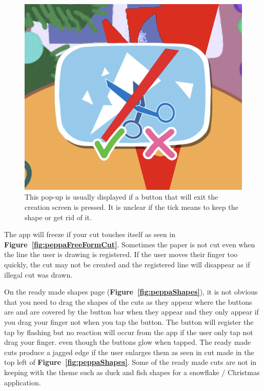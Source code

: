 \documentclass[11pt]{article}
\begin{document}
\begin{figure}[!ht]
                        \begin{minipage}{0.32\textwidth}
                            \centering
                            \includegraphics[width=0.8\linewidth]{Images/peppa/peppaPopUp.png}
                             \caption{This pop-up is usually displayed if a button that will exit the creation screen is pressed. It is unclear if the tick means to keep the shape or get rid of it.}
                            \label{fig:peppaPopUp}
                        \end{minipage}
                    \end{figure}
                    
                    The app will freeze if your cut touches itself as seen in \textbf{Figure~\ref{fig:peppaFreeFormCut}}. Sometimes the paper is not cut even when the line the user is drawing is registered. If the user moves their finger too quickly, the cut may not be created and the registered line will disappear as if illegal cut was drawn.
                    
                    On the ready made shapes page (\textbf{Figure~\ref{fig:peppaShapes}}), it is not obvious that you need to drag the shapes of the cuts as they appear where the buttons are and are covered by the button bar when they appear and they only appear if you drag your finger not when you tap the button. The button will register the tap by flashing but no reaction will occur from the app if the user only tap not drag your finger.  even though the buttons glow when tapped. The ready made cuts produce a jagged edge if the user enlarges them as seen in cut made in the top left of \textbf{Figure~\ref{fig:peppaShapes}}. Some of the ready made cuts are not in keeping with the theme such as duck and fish shapes for a snowflake / Christmas application. 
                
\end{document}
